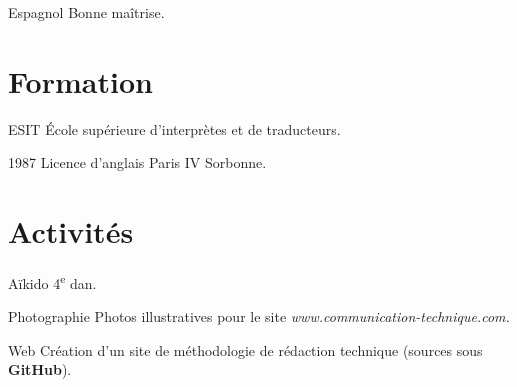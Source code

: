 \documentclass[12pt,a4paper,roman]{moderncv}
\begin{document}
\cvitem
    {Espagnol}
    {Bonne maîtrise.}


\section{Formation}

        {ESIT}
        {École supérieure d'interprètes et de traducteurs.}
        {}
        {}
        {}

\cventry
    {1987}
    {Licence d'anglais}
    { Paris IV Sorbonne.}
    {}
    {}
    {}


\section{Activités}

\cvitem
    {Aïkido}
    {4\textsuperscript{e} dan.}

\cvitem
    {Photographie}
    {Photos illustratives pour le site
      \textit{www.communication-technique.com.}}

\cvitem
    {Web}
    {Création d'un site de méthodologie de rédaction technique (sources sous
      \textbf{GitHub}).}
\end{document}
